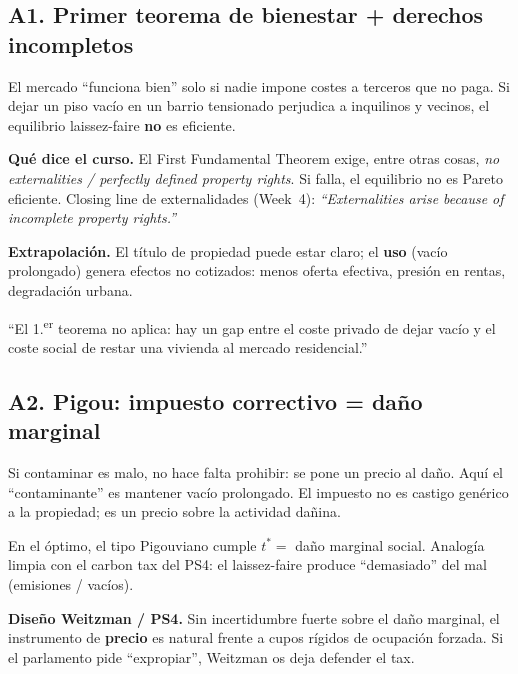 \documentclass[11pt,a4paper]{report}
\begin{document}
\subsection{A1. Primer teorema de bienestar + derechos incompletos}

\begin{intuicion}
El mercado ``funciona bien'' solo si nadie impone costes a terceros que no
paga. Si dejar un piso vac\'io en un barrio tensionado perjudica a inquilinos
y vecinos, el equilibrio laissez-faire \textbf{no} es eficiente.
\end{intuicion}

\textbf{Qu\'e dice el curso.} El First Fundamental Theorem exige, entre otras cosas,
\emph{no externalities / perfectly defined property rights}. Si falla, el
equilibrio no es Pareto eficiente. Closing line de externalidades (Week~4):
\emph{``Externalities arise because of incomplete property rights.''}

\textbf{Extrapolaci\'on.} El t\'itulo de propiedad puede estar claro; el
\textbf{uso} (vac\'io prolongado) genera efectos no cotizados: menos oferta
efectiva, presi\'on en rentas, degradaci\'on urbana.

\begin{frase}
``El 1.\textsuperscript{er} teorema no aplica: hay un gap entre el coste privado
de dejar vac\'io y el coste social de restar una vivienda al mercado residencial.''
\end{frase}

\subsection{A2. Pigou: impuesto correctivo = da\~no marginal}

\begin{intuicion}
Si contaminar es malo, no hace falta prohibir: se pone un precio al da\~no.
Aqu\'i el ``contaminante'' es mantener vac\'io prolongado. El impuesto no es
castigo gen\'erico a la propiedad; es un precio sobre la actividad da\~nina.
\end{intuicion}

\begin{modelo}
En el \'optimo, el tipo Pigouviano cumple $t^{*} =$ da\~no marginal social.
Analog\'ia limpia con el carbon tax del PS4: el laissez-faire produce
``demasiado'' del mal (emisiones / vac\'ios).
\end{modelo}

\textbf{Dise\~no Weitzman / PS4.} Sin incertidumbre fuerte sobre el da\~no
marginal, el instrumento de \textbf{precio} es natural frente a cupos r\'igidos
de ocupaci\'on forzada. Si el parlamento pide ``expropiar'', Weitzman os deja
defender el tax.
\end{document}
